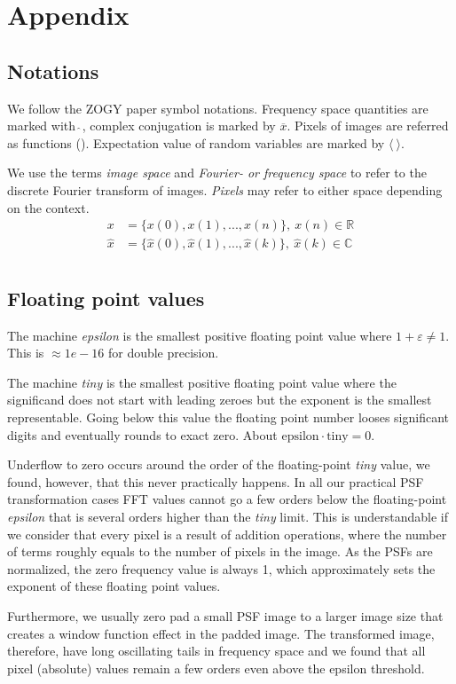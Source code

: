 \section{Appendix\label{sec:appendix}}
\subsection{Notations}
We follow the ZOGY paper symbol notations. Frequency space quantities are
marked with \(\hat{\ }\), complex conjugation is marked by
\(\overline{x}\). Pixels of images are referred as functions
(). Expectation value of random variables are marked by
\(\langle\ \rangle\).
%
\par We use the terms \emph{image space} and \emph{Fourier- or frequency
  space} to refer to the discrete Fourier transform of images. \emph{Pixels}
may refer to either space depending on the context.
\begin{align}
x &= \{x(0), x(1), ... , x(n) \},\ x(n) \in \mathbb{R}\\
\hat{x} &= \{\hat{x}(0), \hat{x}(1), ... , \hat{x}(k) \},\ \hat{x}(k) \in
\mathbb{C}\\
\label{eq:img_func}
\end{align}
%
\subsection{Floating point values\label{sec:floating_point}}
The machine \emph{epsilon} is the smallest positive floating point value
where \(1 + \varepsilon \neq 1\). This is \(\approx 1e-16\) for double
precision.
%
\par The machine \emph{tiny} is the smallest positive floating point value
where the significand does not start with leading zeroes but the exponent is
the smallest representable. Going below this value the floating point number
looses significant digits and eventually rounds to exact zero. About
\(\mathrm{epsilon}\cdot\mathrm{tiny} = 0\).
%
\par Underflow to zero occurs around the order of the floating-point
\emph{tiny} value, we found, however, that this never practically
happens. In all our practical PSF transformation cases FFT values
cannot go a few orders below the floating-point \emph{epsilon} that is
several orders higher than the \emph{tiny} limit. This is
understandable if we consider that every pixel is a result of addition
operations, where the number of terms roughly equals to the number of
pixels in the image. As the PSFs are normalized, the zero frequency
value is always 1, which approximately sets the exponent of these
floating point values.
%
\par Furthermore, we usually zero pad a small PSF image to a larger image
size that creates a window function effect in the padded image. The
transformed image, therefore, have long oscillating tails in frequency space
and we found that all pixel (absolute) values remain a few orders even above
the epsilon threshold.
%
